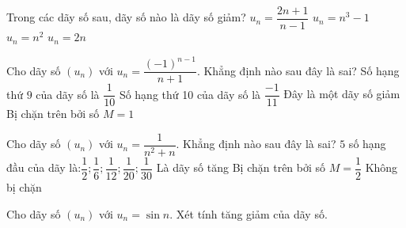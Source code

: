 \begin{ex}%
	Trong các dãy số sau, dãy số  nào là dãy số giảm?
	 \choice
		{  \True $u_n=\dfrac{2n+1}{n-1}$}
		 { $u_n={{n}^3}-1$}
		{  $u_n={{n}^2}$}
		 { $u_n=2n$}
\end{ex}

\begin{ex}%
	Cho dãy  số $( u_n)$ với $u_n=\dfrac{{{(-1)}^{n-1}}}{n+1}$. Khẳng định nào sau đây là sai?
	 \choice
		{Số hạng thứ $9$ của dãy số là  $\dfrac{1}{10}$}
		{Số hạng thứ 10 của dãy số là $\dfrac{-1}{11}$} 
		{\True Đây là một dãy số giảm} 
		{Bị chặn trên bởi số $M=1$} 
\end{ex}

\begin{ex}%
	Cho dãy số $( u_n)$ với $u_n=\dfrac{1}{{{n}^2}+n}$. Khẳng định nào sau đây là sai? 
	 \choice
		 { $5$ số hạng đầu của dãy là:$\dfrac{1}{2};\dfrac{1}{6};\dfrac{1}{12};\dfrac{1}{20};\dfrac{1}{30}$}
		{ \True Là  dãy số tăng}
		{ Bị chặn trên bởi số $M=\dfrac{1}{2}$} 
		{ Không bị  chặn}
\end{ex}

\begin{bt}%
	Cho dãy số $( u_n)$  với $u_n=\sin n$. Xét tính tăng giảm của dãy số.
\end{bt}

